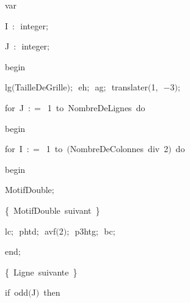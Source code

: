 {\pagebreak[3] 
\vspace{\neglskip}\mbox{\blc  \blk\idt  \mcl var\idt }\par 
\vspace{\neglskip}\mbox{\blc  \blk\blk\idt  I\ $:$\ integer$;$}\par 
\vspace{\neglskip}\mbox{\blc  \blk\blk\idt  J\ $:$\ integer$;$}\par 
\medskip

\vspace{\neglskip}\mbox{\blc  \idt  \mcl begin\idt }\par 
\vspace{\neglskip}\mbox{\blc  \blk\idt  lg$($TailleDeGrille$)$$;$\ eh$;$\ ag$;$\ translater$($1$,$\ $-$3$)$$;$}\par 
\pagebreak[3] 
\vspace{\neglskip}\mbox{\blc  \blk\idt  \mcl for\idt \ J\ $:$$=$\ 1\ \mcl to\idt \ NombreDeLignes\ \mcl do\idt }\par 
\vspace{\neglskip}\mbox{\blc  \blk\blk\idt  \mcl begin\idt }\par 
\pagebreak[3] 
\vspace{\neglskip}\mbox{\blc  \blk\blk\blk\idt  \mcl for\idt \ I\ $:$$=$\ 1\ \mcl to\idt \ $($NombreDeColonnes\ \mcl div\idt \ 2$)$\ \mcl do\idt \ }\par 
\vspace{\neglskip}\mbox{\blc  \blk\blk\blk\blk\idt  \mcl begin\idt }\par 
\vspace{\neglskip}\mbox{\blc  \blk\blk\blk\blk\blk\idt  MotifDouble$;$}\par 
\vspace{\neglskip}\mbox{\blc  \blk\blk\blk\blk\blk\idt  \cmt  \{\ MotifDouble\ suivant\ \}\idt \ }\par 
\vspace{\neglskip}\mbox{\blc  \blk\blk\blk\blk\blk\idt  lc$;$\ phtd$;$\ avf$($2$)$$;$\ p3htg$;$\ bc$;$}\par 
\vspace{\neglskip}\mbox{\blc  \blk\blk\blk\blk\idt  \mcl end\idt $;$}\par 
\vspace{\neglskip}\mbox{\blc  \blk\blk\blk\idt  \cmt  \{\ Ligne\ suivante\ \}\idt \ }\par 
\pagebreak[3] 
\vspace{\neglskip}\mbox{\blc  \blk\blk\blk\blk\idt  \mcl if\idt \ odd$($J$)$\ \mcl then\idt }\par 
}
